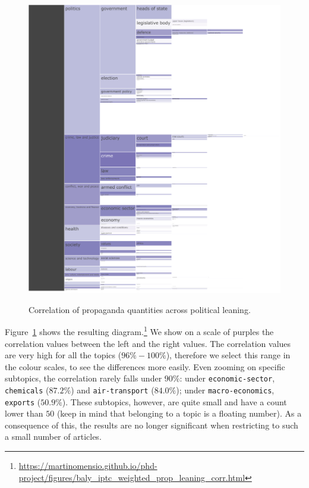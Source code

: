 \begin{figure}[!htbp]
    \centering
    \href{https://martinomensio.github.io/phd-project/figures/baly_iptc_weighted_prop_leaning_corr.html}{\includegraphics[trim={2.65cm 0cm 0cm 0cm},clip,width=\linewidth]{figures/baly_iptc_weighted_prop_leaning_corr.pdf}}
    \caption{Correlation of propaganda quantities across political leaning.}
    \label{fig:baly_iptc_weighted_prop_leaning_corr}
\end{figure}

Figure~\ref{fig:baly_iptc_weighted_prop_leaning_corr} shows the resulting diagram.\footnote{\url{https://martinomensio.github.io/phd-project/figures/baly_iptc_weighted_prop_leaning_corr.html}}
We show on a scale of purples the correlation values between the left and the right values.
The correlation values are very high for all the topics ($96\% - 100\%$), therefore we select this range in the colour scales, to see the differences more easily.
Even zooming on specific subtopics, the correlation rarely falls under $90\%$: under \texttt{economic-sector}, \texttt{chemicals} ($87.2\%$) and \texttt{air-transport} ($84.0\%$); under \texttt{macro-economics}, \texttt{exports} ($50.9\%$). 
These subtopics, however, are quite small and have a count lower than $50$ (keep in mind that belonging to a topic is a floating number). As a consequence of this, the results are no longer significant when restricting to such a small number of articles.

